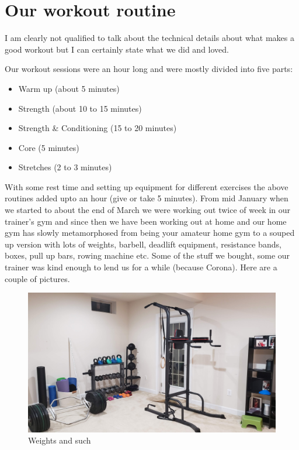 \documentclass[
  oneside]{book}
\providecommand{\tightlist}{%
  \setlength{\itemsep}{0pt}\setlength{\parskip}{0pt}}
\begin{document}
\hypertarget{our-workout-routine}{%
\section{Our workout routine}\label{our-workout-routine}}

I am clearly not qualified to talk about the technical details about what makes a good workout but I can certainly state what we did and loved.

Our workout sessions were an hour long and were mostly divided into five parts:

\begin{itemize}
\tightlist
\item
  Warm up (about 5 minutes)
\item
  Strength (about 10 to 15 minutes)
\item
  Strength \& Conditioning (15 to 20 minutes)
\item
  Core (5 minutes)
\item
  Stretches (2 to 3 minutes)
\end{itemize}

With some rest time and setting up equipment for different exercises the above routines added upto an hour (give or take 5 minutes). From mid January when we started to about the end of March we were working out twice of week in our trainer's gym and since then we have been working out at home and our home gym has slowly metamorphosed from being your amateur home gym to a souped up version with lots of weights, barbell, deadlift equipment, resistance bands, boxes, pull up bars, rowing machine etc. Some of the stuff we bought, some our trainer was kind enough to lend us for a while (because Corona). Here are a couple of pictures.

\begin{figure}
\centering
\includegraphics{pictures/gym2.jpg}
\caption{Weights and such}
\end{figure}
\end{document}
